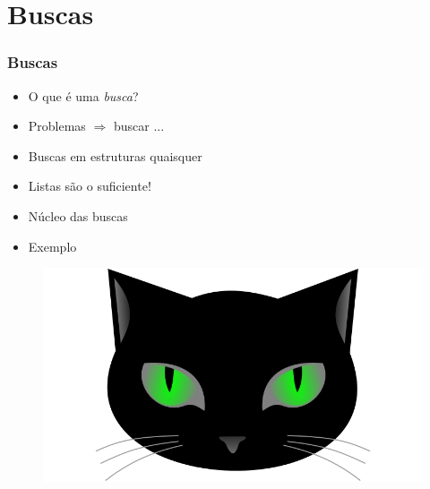 
\section{Buscas}


\begin{frame}
\frametitle{Buscas}
\begin{minipage}{0.47\textwidth}
    \begin{itemize}
        \item O que é uma \textit{busca}?
        \item Problemas $\Rightarrow$ buscar ...
        \item Buscas em estruturas quaisquer
        \item Listas são o suficiente!
        \item Núcleo das buscas
        \item Exemplo
    \end{itemize}
\end{minipage}
\begin{minipage}{0.5\textwidth}
\begin{figure}[ht!]
\begin{center}
\includegraphics[width=1.2\textwidth, height=0.40\textheight]{figures/logo_picat_alex.jpg}
\end{center}
\end{figure}
\end{minipage}
\end{frame}




